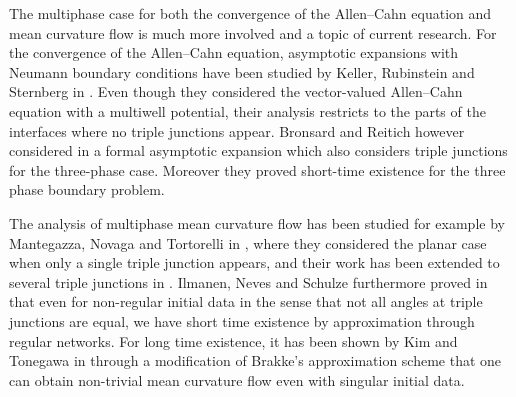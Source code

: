The multiphase case for both the convergence of the Allen--Cahn equation and 
mean 
curvature flow is much more involved and a topic of current research. For the 
convergence of the Allen--Cahn equation, asymptotic expansions  with Neumann 
boundary conditions 
have been studied by Keller, Rubinstein and Sternberg in 
\cite{keller_rubinstein_sternberg_fast_reaction_slow_diffusion}. Even though 
they considered the vector-valued Allen--Cahn equation with a multiwell 
potential, their analysis restricts to the parts of the interfaces where no 
triple junctions appear. Bronsard and 
Reitich however considered in 
\cite{bronsard_reitich_on_three_phase_boundary_motion_and_singular_limit} a 
formal asymptotic expansion which also considers triple junctions
for the three-phase case. Moreover they proved short-time existence for the 
three 
phase boundary problem.

The analysis of multiphase mean curvature flow has been studied for example by 
Mantegazza, Novaga and Tortorelli in 
\cite{mantegazza_novaga_tortorelli_motion_by_curvature_of_planar_networks}, 
where they considered the planar case when only a single triple junction 
appears, and their work has been extended to several triple junctions in 
\cite{mantegazza_novaga_pluda_schule_evolution_of_networks_with_multiple_junctions}.
Ilmanen, Neves and Schulze furthermore proved in 
\cite{ilmanen_neves_schulze_on_short_time_existence_for_the_planar_network_flow}
that even for non-regular initial data in the sense that not all angles at 
triple junctions are equal, we have short time existence by approximation 
through regular networks. For long time existence, it has been shown by Kim and 
Tonegawa in \cite{kim_tonegawa_on_the_mean_curvature_flow_of_grain_boundaries} 
through a modification of Brakke's approximation scheme that one can obtain 
non-trivial mean curvature flow even with singular initial data.

